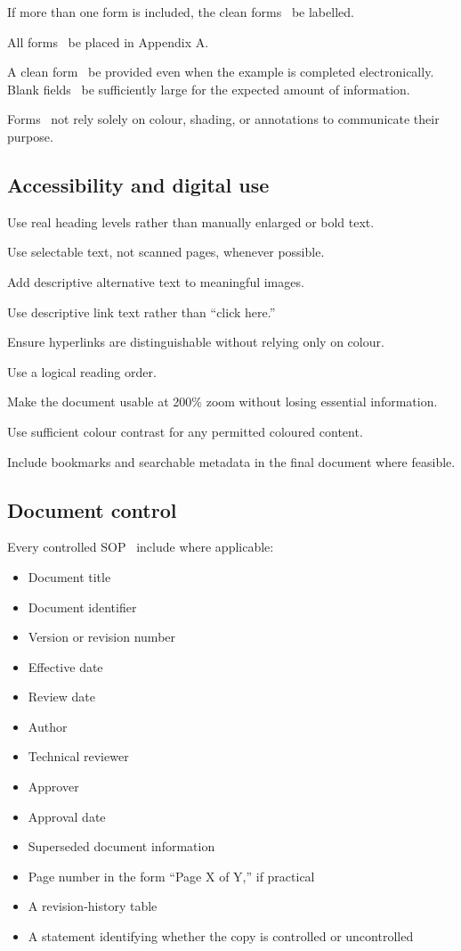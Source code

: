 If more than one form is included, the clean forms \must~be labelled.

All forms \must~be placed in Appendix A.

A clean form \must~be provided even when the example is completed electronically. Blank fields \must~be sufficiently large for the expected amount of information.

Forms \must~not rely solely on colour, shading, or annotations to communicate their purpose.

\subsection{Accessibility and digital use}

Use real heading levels rather than manually enlarged or bold text.

Use selectable text, not scanned pages, whenever possible.

Add descriptive alternative text to meaningful images.

Use descriptive link text rather than “click here.”

Ensure hyperlinks are distinguishable without relying only on colour.

Use a logical reading order.

Make the document usable at 200\% zoom without losing essential information.

Use sufficient colour contrast for any permitted coloured content.

Include bookmarks and searchable metadata in the final document where feasible.

\subsection{Document control}

Every controlled SOP \should~include where applicable:
\begin{itemize}
    \item Document title
    \item Document identifier
    \item Version or revision number
    \item Effective date
    \item Review date
    \item Author
    \item Technical reviewer
    \item Approver
    \item Approval date
    \item Superseded document information
    \item Page number in the form “Page X of Y,” if practical
    \item A revision-history table
    \item A statement identifying whether the copy is controlled or uncontrolled
\end{itemize}